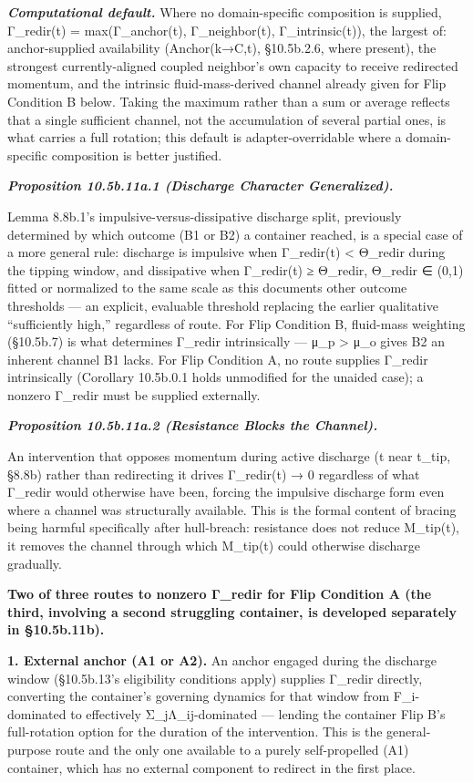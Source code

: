 \documentclass[
]{article}
\begin{document}
\emph{\textbf{Computational default.}} Where no domain-specific
composition is supplied, Γ\_redir(t) = max(Γ\_anchor(t), Γ\_neighbor(t),
Γ\_intrinsic(t)), the largest of: anchor-supplied availability
(Anchor(k→C,t), §10.5b.2.6, where present), the strongest
currently-aligned coupled neighbor's own capacity to receive redirected
momentum, and the intrinsic fluid-mass-derived channel already given for
Flip Condition B below. Taking the maximum rather than a sum or average
reflects that a single sufficient channel, not the accumulation of
several partial ones, is what carries a full rotation; this default is
adapter-overridable where a domain-specific composition is better
justified.

\emph{\textbf{Proposition 10.5b.11a.1 (Discharge Character
Generalized).}}

Lemma 8.8b.1's impulsive-versus-dissipative discharge split, previously
determined by which outcome (B1 or B2) a container reached, is a special
case of a more general rule: discharge is impulsive when Γ\_redir(t)
\textless{} Θ\_redir during the tipping window, and dissipative when
Γ\_redir(t) ≥ Θ\_redir, Θ\_redir ∈ (0,1) fitted or normalized to the
same scale as this documents other outcome thresholds --- an explicit,
evaluable threshold replacing the earlier qualitative ``sufficiently
high,'' regardless of route. For Flip Condition B, fluid-mass weighting
(§10.5b.7) is what determines Γ\_redir intrinsically --- μ\_p
\textgreater{} μ\_o gives B2 an inherent channel B1 lacks. For Flip
Condition A, no route supplies Γ\_redir intrinsically (Corollary
10.5b.0.1 holds unmodified for the unaided case); a nonzero Γ\_redir
must be supplied externally.

\emph{\textbf{Proposition 10.5b.11a.2 (Resistance Blocks the Channel).}}

An intervention that opposes momentum during active discharge (t near
t\_tip, §8.8b) rather than redirecting it drives Γ\_redir(t) → 0
regardless of what Γ\_redir would otherwise have been, forcing the
impulsive discharge form even where a channel was structurally
available. This is the formal content of bracing being harmful
specifically after hull-breach: resistance does not reduce M\_tip(t), it
removes the channel through which M\_tip(t) could otherwise discharge
gradually.

\textbf{Two of three routes to nonzero Γ\_redir for Flip Condition A
(the third, involving a second struggling container, is developed
separately in §10.5b.11b).}

\textbf{1. External anchor (A1 or A2).} An anchor engaged during the
discharge window (§10.5b.13's eligibility conditions apply) supplies
Γ\_redir directly, converting the container's governing dynamics for
that window from F\_i-dominated to effectively Σ\_jΛ\_ij-dominated ---
lending the container Flip B's full-rotation option for the duration of
the intervention. This is the general-purpose route and the only one
available to a purely self-propelled (A1) container, which has no
external component to redirect in the first place.
\end{document}
